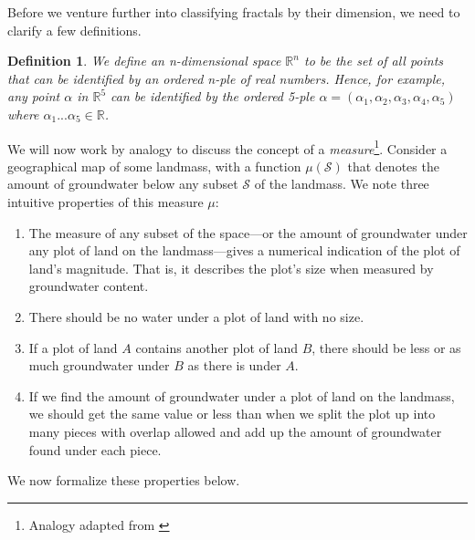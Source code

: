 Before we venture further into classifying fractals by their dimension, we need to clarify a few definitions.

\newtheorem{mydef}{Definition}
\begin{mydef}
We define an n-dimensional space $ \mathbb{R}^{n} $ to be the set of all points that can be identified by an ordered n-ple of real numbers. Hence, for example, any point $ \alpha $ in $ \mathbb{R}^{5} $ can be identified by the ordered 5-ple $ \alpha = (\alpha_{1}, \alpha_{2}, \alpha_{3}, \alpha_{4}, \alpha_{5})$ where $ \alpha_{1} ... \alpha_{5} \in \mathbb{R} $.\end{mydef}

We will now work by analogy to discuss the concept of a \textit{measure}\footnote{Analogy adapted from \citep{mandelbrotmultifractal}}. Consider a geographical map of some landmass, with a function $ \mu(\mathcal{S}) $ that denotes the amount of groundwater below any subset $ \mathcal{S} $ of the landmass. We note three intuitive properties of this measure $ \mu $:
\begin{enumerate}
\item The measure of any subset of the space---or the amount of groundwater under any plot of land on the landmass---gives a numerical indication of the plot of land's magnitude. That is, it describes the plot's size when measured by groundwater content.
\item\label{measureofanullset} There should be no water under a plot of land with no size. 
\item\label{measureofsubsets} If a plot of land $ A $ contains another plot of land $ B $, there should be less or as much groundwater under $B$ as there is under $A$. 
\item\label{measureaddition} If we find the amount of groundwater under a plot of land on the landmass, we should get the same value or less than when we split the plot up into many pieces with overlap allowed and add up the amount of groundwater found under each piece. 
\end{enumerate}
We now formalize these properties below.

